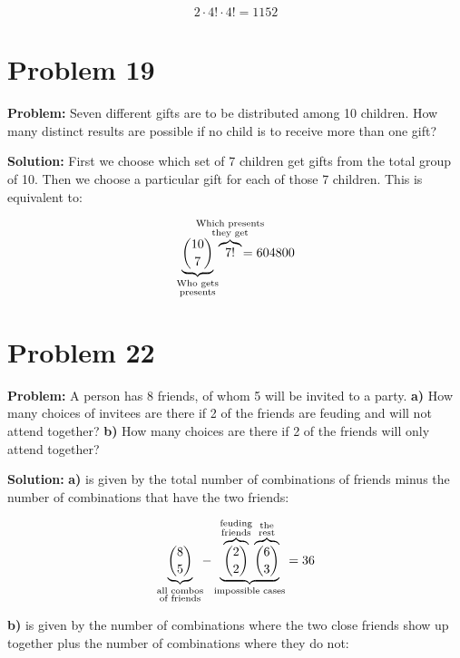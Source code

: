 \documentclass{article}
\begin{document}
\begin{equation*}
    2\cdot4!\cdot4!=1152
\end{equation*}

\section*{Problem 19}
\noindent\textbf{Problem:} Seven different gifts are to be distributed among 10 children. How many distinct results are possible if no child is to receive more than one gift?
\bigskip

\noindent\textbf{Solution:} First we choose which set of 7 children get gifts from the total group of 10. Then we choose a particular gift for each of those 7 children. This is equivalent to:

\begin{equation*}
    \underbrace{\binom{10}{7}}_{\substack{\text{Who gets}\\\text{presents}}}\mkern-35mu\overbrace{7!}^{\substack{\text{Which presents}\\\text{they get}}}\mkern-35mu=604800
\end{equation*}

\section*{Problem 22}
\noindent\textbf{Problem:} A person has 8 friends, of whom 5 will be invited to a party. \textbf{a)} How many choices of invitees are there if 2 of the friends are feuding and will not attend together? \textbf{b)} How many choices are there if 2 of the friends will only attend together?
\bigskip

\noindent\textbf{Solution:} \textbf{a)} is given by the total number of combinations of friends minus the number of combinations that have the two friends:

\begin{equation*}
    \underbrace{\binom{8}{5}}_{\substack{\text{all combos}\\ \text{of friends}}}\mkern-5mu-\underbrace{\overbrace{\binom{2}{2}}^{\substack{\text{feuding}\\ \text{friends}}}\overbrace{\binom{6}{3}}^{\substack{\text{the}\\ \text{rest}}}}_{\text{impossible cases}}=36
\end{equation*}
\bigskip

\textbf{b)} is given by the number of combinations where the two close friends show up together plus the number of combinations where they do not:
\end{document}
